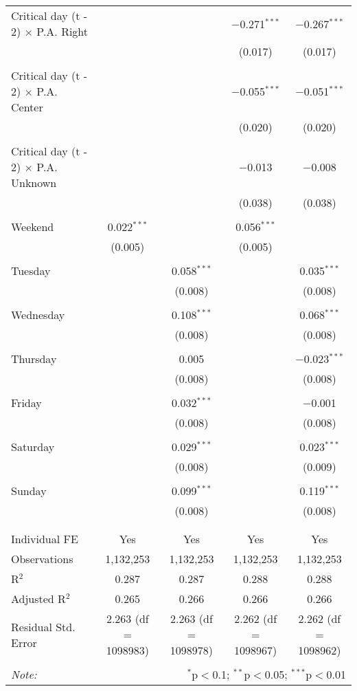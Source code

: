 \documentclass[
]{article}
\begin{document}
\begin{table}[!htbp]
{\begin{tabular}{@{\extracolsep{5pt}}lcccc}
 Critical day (t - 2) $\times$ P.A. Right &  &  & $-$0.271$^{***}$ & $-$0.267$^{***}$ \\ 
  &  &  & (0.017) & (0.017) \\ 
  & & & & \\ 
 Critical day (t - 2) $\times$ P.A. Center &  &  & $-$0.055$^{***}$ & $-$0.051$^{***}$ \\ 
  &  &  & (0.020) & (0.020) \\ 
  & & & & \\ 
 Critical day (t - 2) $\times$ P.A. Unknown &  &  & $-$0.013 & $-$0.008 \\ 
  &  &  & (0.038) & (0.038) \\ 
  & & & & \\ 
 Weekend & 0.022$^{***}$ &  & 0.056$^{***}$ &  \\ 
  & (0.005) &  & (0.005) &  \\ 
  & & & & \\ 
 Tuesday &  & 0.058$^{***}$ &  & 0.035$^{***}$ \\ 
  &  & (0.008) &  & (0.008) \\ 
  & & & & \\ 
 Wednesday &  & 0.108$^{***}$ &  & 0.068$^{***}$ \\ 
  &  & (0.008) &  & (0.008) \\ 
  & & & & \\ 
 Thursday &  & 0.005 &  & $-$0.023$^{***}$ \\ 
  &  & (0.008) &  & (0.008) \\ 
  & & & & \\ 
 Friday &  & 0.032$^{***}$ &  & $-$0.001 \\ 
  &  & (0.008) &  & (0.008) \\ 
  & & & & \\ 
 Saturday &  & 0.029$^{***}$ &  & 0.023$^{***}$ \\ 
  &  & (0.008) &  & (0.009) \\ 
  & & & & \\ 
 Sunday &  & 0.099$^{***}$ &  & 0.119$^{***}$ \\ 
  &  & (0.008) &  & (0.008) \\ 
  & & & & \\ 
\hline \\[-1.8ex] 
Individual FE & Yes & Yes & Yes & Yes \\ 
Observations & 1,132,253 & 1,132,253 & 1,132,253 & 1,132,253 \\ 
R$^{2}$ & 0.287 & 0.287 & 0.288 & 0.288 \\ 
Adjusted R$^{2}$ & 0.265 & 0.266 & 0.266 & 0.266 \\ 
Residual Std. Error & 2.263 (df = 1098983) & 2.263 (df = 1098978) & 2.262 (df = 1098967) & 2.262 (df = 1098962) \\ 
\hline 
\hline \\[-1.8ex] 
\textit{Note:}  & \multicolumn{4}{r}{$^{*}$p$<$0.1; $^{**}$p$<$0.05; $^{***}$p$<$0.01} \\ 
\end{tabular}
} 
\end{table} 
\newpage
\end{document}
